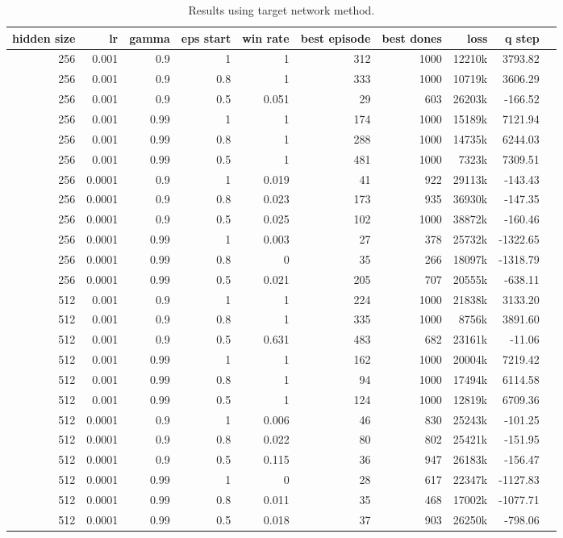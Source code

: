 \begin{table}[h]
	\centering
	\scriptsize
	\begin{tabular}{r r r r | r r r r r r}
		\toprule
			hidden size & lr & gamma & eps start & win rate & best episode & best dones & loss & q step \\
		\midrule
			256 & 0.001 & 0.9 & 1 & 1 & 312 & 1000 & 12210k & 3793.82 \\
			256 & 0.001 & 0.9 & 0.8 & 1 & 333 & 1000 & 10719k & 3606.29 \\
			256 & 0.001 & 0.9 & 0.5 & 0.051 & 29 & 603 & 26203k & -166.52 \\
			256 & 0.001 & 0.99 & 1 & 1 & 174 & 1000 & 15189k & 7121.94 \\
			256 & 0.001 & 0.99 & 0.8 & 1 & 288 & 1000 & 14735k & 6244.03 \\
			256 & 0.001 & 0.99 & 0.5 & 1 & 481 & 1000 & 7323k & 7309.51 \\
			256 & 0.0001 & 0.9 & 1 & 0.019 & 41 & 922 & 29113k & -143.43 \\
			256 & 0.0001 & 0.9 & 0.8 & 0.023 & 173 & 935 & 36930k & -147.35 \\
			256 & 0.0001 & 0.9 & 0.5 & 0.025 & 102 & 1000 & 38872k & -160.46 \\
			256 & 0.0001 & 0.99 & 1 & 0.003 & 27 & 378 & 25732k & -1322.65 \\
			256 & 0.0001 & 0.99 & 0.8 & 0 & 35 & 266 & 18097k & -1318.79 \\
			256 & 0.0001 & 0.99 & 0.5 & 0.021 & 205 & 707 & 20555k & -638.11 \\
			512 & 0.001 & 0.9 & 1 & 1 & 224 & 1000 & 21838k & 3133.20 \\
			512 & 0.001 & 0.9 & 0.8 & 1 & 335 & 1000 & 8756k & 3891.60 \\
			512 & 0.001 & 0.9 & 0.5 & 0.631 & 483 & 682 & 23161k & -11.06 \\
			512 & 0.001 & 0.99 & 1 & 1 & 162 & 1000 & 20004k & 7219.42 \\
			\rowcolor{YellowGreen}
			512 & 0.001 & 0.99 & 0.8 & 1 & 94 & 1000 & 17494k & 6114.58 \\
			512 & 0.001 & 0.99 & 0.5 & 1 & 124 & 1000 & 12819k & 6709.36 \\
			512 & 0.0001 & 0.9 & 1 & 0.006 & 46 & 830 & 25243k & -101.25 \\
			512 & 0.0001 & 0.9 & 0.8 & 0.022 & 80 & 802 & 25421k & -151.95 \\
			512 & 0.0001 & 0.9 & 0.5 & 0.115 & 36 & 947 & 26183k & -156.47 \\
			512 & 0.0001 & 0.99 & 1 & 0 & 28 & 617 & 22347k & -1127.83 \\
			512 & 0.0001 & 0.99 & 0.8 & 0.011 & 35 & 468 & 17002k & -1077.71 \\
			512 & 0.0001 & 0.99 & 0.5 & 0.018 & 37 & 903 & 26250k & -798.06 \\
		\bottomrule
	\end{tabular}
	\caption{Results using target network method.}
	\label{targetnetwork_results}
\end{table}

